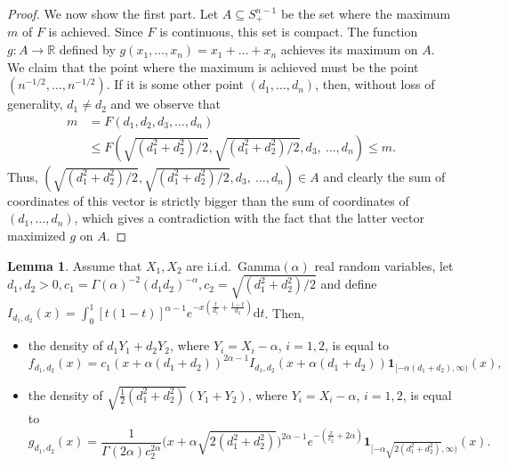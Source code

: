 \documentclass[11pt]{amsart}
\newcommand{\dd}{\mathrm{d}}
\newcommand{\1}{\mathbf{1}}
\newcommand{\R}{\mathbb{R}}
\theoremstyle{definition}
\newtheorem{lemma}{Lemma}
\theoremstyle{definition}
\theoremstyle{remark}
\begin{document}
\begin{proof}
We now show the first part. Let $A \subseteq S_+^{n-1}$ be the set where the maximum $m$ of $F$ is achieved. Since $F$ is continuous, this set is compact. The function $g:A \to \R$ defined by $g(x_1, \ldots, x_n) = x_1+\ldots+x_n$ achieves its maximum on $A$. We claim that the point where the maximum is achieved must be the point $(n^{-1/2},\ldots, n^{-1/2})$. If it is some other point $(d_1,\ldots, d_n)$, then, without loss of generality, $d_1 \ne d_2$ and we observe that
\begin{align*}
 m & = F(d_1, d_2, d_3, \ldots, d_n) \\ & \leq   F\left(\sqrt{(d_1^2+d_2^2)/2}, \sqrt{(d_1^2+d_2^2)/2}, d_3,\ \ldots, d_n\right) \leq m.
\end{align*}
Thus, $\left(\sqrt{(d_1^2+d_2^2)/2}, \sqrt{(d_1^2+d_2^2)/2}, d_3,\ \ldots, d_n\right) \in A$ and clearly the sum of coordinates of this vector is strictly bigger than the sum of coordinates of $(d_1, \ldots, d_n)$, which gives a contradiction with the fact that the latter vector maximized $g$ on $A$.
\end{proof}



\begin{lemma}\label{lem:technical-density-bessel}
Assume that $X_1, X_2$ are i.i.d.\ Gamma$(\alpha)$ real random variables, let $d_1,d_2>0,c_1 = \Gamma(\alpha)^{-2} (d_1 d_2)^{-\alpha}, c_2=\sqrt{(d_1^2+d_2^2)/2}$ and define $I_{d_1, d_2}(x) = \int_0^1 [t(1-t)]^{\alpha-1} e^{-x\left(\frac{t}{d_1}+\frac{1-t}{d_2}\right)}\dd t$. Then,
\begin{itemize}
\item[(a)] the density of $d_1 Y_1 + d_2 Y_2$, where $Y_i=X_i-\alpha$, $i=1,2$, is equal to
\[
	f_{d_1, d_2}(x) =
	c_1(x+\alpha(d_1+d_2))^{2\alpha-1} I_{d_1, d_2}(x+\alpha(d_1+d_2)) \1_{[-\alpha(d_1+d_2),\infty)}(x), 
\]
\item[(b)] the density of $\sqrt{\frac12\left(d_1^2+d_2^2\right)}( Y_1 + Y_2)$, where $Y_i=X_i-\alpha$, $i=1,2$, is equal to
\[
	g_{d_1, d_2}(x) = \frac{1}{\Gamma(2\alpha)c_2^{2\alpha}}\Big(x+\alpha\sqrt{2(d_1^2+d_2^2)}\Big)^{2\alpha-1}e^{-\left(\frac{x}{c_2}+2\alpha\right)} \1_{[-\alpha\sqrt{2(d_1^2+d_2^2)},\infty)}(x).
\]
\end{itemize}
\end{lemma}
\end{document}
